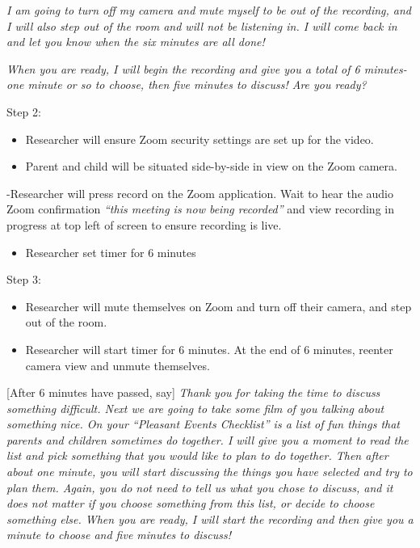 \documentclass[]{book}
\providecommand{\tightlist}{%
  \setlength{\itemsep}{0pt}\setlength{\parskip}{0pt}}
\begin{document}
\emph{I am going to turn off my camera and mute myself to be out of the recording, and I will also step out of the room and will not be listening in. I will come back in and let you know when the six minutes are all done!}

\emph{When you are ready, I will begin the recording and give you a total of 6 minutes- one minute or so to choose, then five minutes to discuss! Are you ready?}

Step 2:

\begin{itemize}
\item
  Researcher will ensure Zoom security settings are set up for the video.
\item
  Parent and child will be situated side-by-side in view on the Zoom camera.
\end{itemize}

-Researcher will press record on the Zoom application. Wait to hear the audio Zoom confirmation \emph{``this meeting is now being recorded''} and view recording in progress at top left of screen to ensure recording is live.

\begin{itemize}
\tightlist
\item
  Researcher set timer for 6 minutes
\end{itemize}

Step 3:

\begin{itemize}
\item
  Researcher will mute themselves on Zoom and turn off their camera, and step out of the room.
\item
  Researcher will start timer for 6 minutes. At the end of 6 minutes, reenter camera view and unmute themselves.
\end{itemize}

{[}After 6 minutes have passed, say{]} \emph{Thank you for taking the time to discuss something difficult. Next we are going to take some film of you talking about something nice. On your ``Pleasant Events Checklist'' is a list of fun things that parents and children sometimes do together. I will give you a moment to read the list and pick something that you would like to plan to do together. Then after about one minute, you will start discussing the things you have selected and try to plan them. Again, you do not need to tell us what you chose to discuss, and it does not matter if you choose something from this list, or decide to choose something else. When you are ready, I will start the recording and then give you a minute to choose and five minutes to discuss!}
\end{document}
